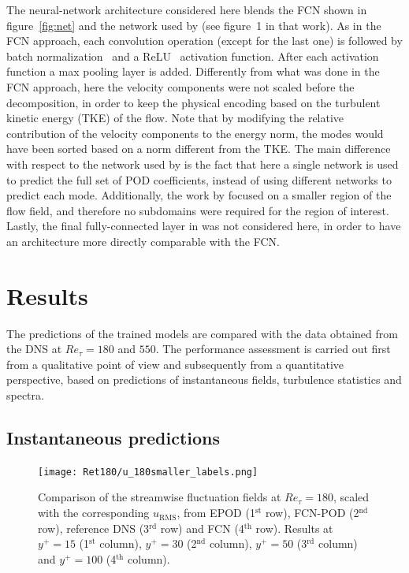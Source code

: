 The neural-network architecture considered here blends the FCN shown in figure~\ref{fig:net} and the network used by \citet{guemes2019sensing} (see figure~1 in that work).
As in the FCN approach, each convolution operation (except for the last one) is followed by batch normalization~\citep{ioffe2015batch} and a ReLU~\citep{nair2010rectified} activation function.
After each activation function a max pooling layer is added.
Differently from what was done in the FCN approach, here the velocity components were not scaled before the decomposition, in order to keep the physical encoding based on the turbulent kinetic energy (TKE) of the flow.
Note that by modifying the relative contribution of the velocity components to the energy norm, the modes would have been sorted based on a norm different from the TKE.
The main difference with respect to the network used by \citet{guemes2019sensing} is the fact that here a single network is used to predict the full set of POD coefficients, instead of using different networks to predict each mode.
Additionally, the work by \citet{guemes2019sensing} focused on a smaller region of the flow field, and therefore no subdomains were required for the region of interest.
Lastly, the final fully-connected layer in \citet{guemes2019sensing} was not considered here, in order to have an architecture more directly comparable with the FCN.

\section{Results}\label{ss:results}
The predictions of the trained models are compared with the data obtained from the DNS at $Re_{\tau}=180$ and $550$.
The performance assessment is carried out first from a qualitative point of view and subsequently from a quantitative perspective, based on predictions of instantaneous fields, turbulence statistics and spectra.
\subsection{Instantaneous predictions}\label{ss:inst}
\begin{figure}
\begin{center}
\texttt{[image: Ret180/u\_180smaller\_labels.png]}
\end{center}
\caption{\label{fig:field_comp180} Comparison of the streamwise fluctuation fields at $Re_{\tau} = 180$, scaled with the corresponding $u_\mathrm{RMS}$, from EPOD (1$^{\text{st}}$ row), FCN-POD (2$^{\text{nd}}$ row), reference DNS (3$^{\text{rd}}$ row) and FCN (4$^{\text{th}}$ row). Results at $y^+=15$ (1$^{\text{st}}$ column), $y^+=30$ (2$^{\text{nd}}$ column), $y^+=50$ (3$^{\text{rd}}$ column) and $y^+=100$ (4$^{\text{th}}$ column).}
\end{figure}

